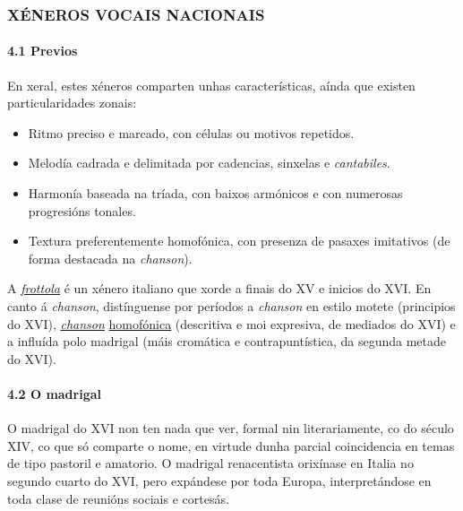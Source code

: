 \documentclass[
]{article}
\begin{document}
\hypertarget{xuxe9neros-vocais-nacionais}{%
\subsubsection{XÉNEROS VOCAIS
NACIONAIS}\label{xuxe9neros-vocais-nacionais}}

\hypertarget{41-previos}{%
\paragraph{\texorpdfstring{\textbf{4.1
Previos}}{4.1 Previos}}\label{41-previos}}

En xeral, estes xéneros comparten unhas características, aínda que
existen particularidades zonais:

\begin{itemize}
\item
  Ritmo preciso e marcado, con células ou motivos repetidos.
\item
  Melodía cadrada e delimitada por cadencias, sinxelas e
  \emph{cantabiles}.
\item
  Harmonía baseada na tríada, con baixos armónicos e con numerosas
  progresións tonales.
\item
  Textura preferentemente homofónica, con presenza de pasaxes imitativos
  (de forma destacada na \emph{chanson}).
\end{itemize}

A
\href{http://open.spotify.com/track/0d6zn7tm3FYToN3oR0ad9M}{\emph{frottola}}
é un xénero italiano que xorde a finais do XV e inicios do XVI. En canto
á \emph{chanson}, distínguense por períodos a \emph{chanson} en estilo
motete (principios do XVI),
\emph{\href{http://open.spotify.com/track/3Gnfe3ubxrEsquzLAGx9uH}{chanson}}
\href{http://open.spotify.com/track/3Gnfe3ubxrEsquzLAGx9uH}{homofónica}
(descritiva e moi expresiva, de mediados do XVI) e a influída polo
madrigal (máis cromática e contrapuntística, da segunda metade do XVI).

\hypertarget{42-o-madrigal}{%
\paragraph{\texorpdfstring{\textbf{4.2 O
madrigal}}{4.2 O madrigal}}\label{42-o-madrigal}}

O madrigal do XVI non ten nada que ver, formal nin literariamente, co do
século XIV, co que só comparte o nome, en virtude dunha parcial
coincidencia en temas de tipo pastoril e amatorio. O madrigal
renacentista orixínase en Italia no segundo cuarto do XVI, pero
expándese por toda Europa, interpretándose en toda clase de reunións
sociais e cortesás.
\end{document}
